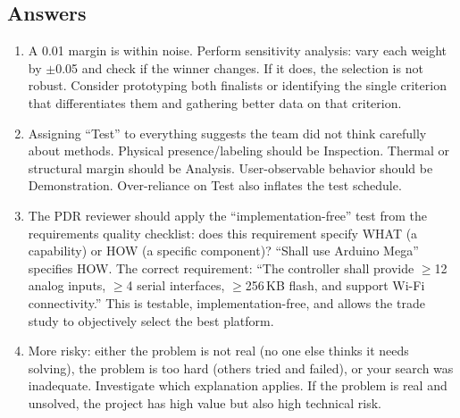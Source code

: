 \subsection{Answers}
\begin{enumerate}[leftmargin=1.5em]
\item A 0.01 margin is within noise. Perform sensitivity analysis: vary each weight by $\pm$0.05 and check if the winner changes. If it does, the selection is not robust. Consider prototyping both finalists or identifying the single criterion that differentiates them and gathering better data on that criterion.
\item Assigning ``Test'' to everything suggests the team did not think carefully about methods. Physical presence/labeling should be Inspection. Thermal or structural margin should be Analysis. User-observable behavior should be Demonstration. Over-reliance on Test also inflates the test schedule.

\item The PDR reviewer should apply the ``implementation-free'' test from the requirements quality checklist: does this requirement specify WHAT (a capability) or HOW (a specific component)? ``Shall use Arduino Mega'' specifies HOW. The correct requirement: ``The controller shall provide $\geq$12 analog inputs, $\geq$4 serial interfaces, $\geq$256\,KB flash, and support Wi-Fi connectivity.'' This is testable, implementation-free, and allows the trade study to objectively select the best platform.
\item More risky: either the problem is not real (no one else thinks it needs solving), the problem is too hard (others tried and failed), or your search was inadequate. Investigate which explanation applies. If the problem is real and unsolved, the project has high value but also high technical risk.
\end{enumerate}


